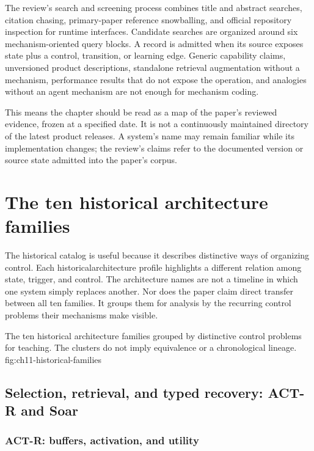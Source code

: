 The review's search and screening process combines title and abstract searches, citation chasing, primary-paper reference snowballing, and official repository inspection for runtime interfaces. Candidate searches are organized around six mechanism-oriented query blocks. A record is admitted when its source exposes state plus a control, transition, or learning edge. Generic capability claims, unversioned product descriptions, standalone retrieval augmentation without a mechanism, performance results that do not expose the operation, and analogies without an agent mechanism are not enough for mechanism coding.

This means the chapter should be read as a map of the paper's reviewed evidence, frozen at a specified date. It is not a continuously maintained directory of the latest product releases. A system's name may remain familiar while its implementation changes; the review's claims refer to the documented version or source state admitted into the paper's corpus.

\section{The ten historical architecture families}
\label{sec:ch11-historical-families}

The historical catalog is useful because it describes distinctive ways of organizing control. Each \gls{historicalarchitecture} profile highlights a different relation among state, trigger, and control. The architecture names are not a timeline in which one system simply replaces another. Nor does the paper claim direct transfer between all ten families. It groups them for analysis by the recurring control problems their mechanisms make visible.

  {The ten historical architecture families grouped by distinctive control problems for teaching. The clusters do not imply equivalence or a chronological lineage.}
  {fig:ch11-historical-families}

\subsection{Selection, retrieval, and typed recovery: ACT-R and Soar}
\label{sec:ch11-actr-soar}

\subsubsection{ACT-R: buffers, activation, and utility}

